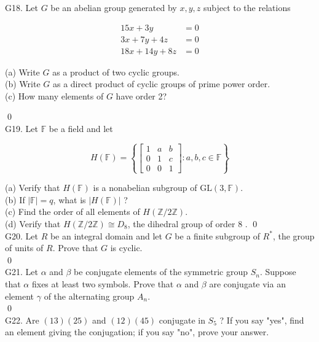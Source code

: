 G18. Let $G$ be an abelian group generated by $x, y, z$ subject to the relations

$$
\begin{aligned}
	15 x+3 y & =0 \\
	3 x+7 y+4 z & =0 \\
	18 x+14 y+8 z & =0
\end{aligned}
$$

(a) Write $G$ as a product of two cyclic groups.\\
(b) Write $G$ as a direct product of cyclic groups of prime power order.\\
(c) How many elements of $G$ have order 2?

\soln
\qed\\

G19. Let $\mathbb{F}$ be a field and let

$$
H(\mathbb{F})=\left\{\left[\begin{array}{ccc}
	1 & a & b \\
	0 & 1 & c \\
	0 & 0 & 1
\end{array}\right]: a, b, c \in \mathbb{F}\right\}
$$

(a) Verify that $H(\mathbb{F})$ is a nonabelian subgroup of $\mathrm{GL}(3, \mathbb{F})$.\\
(b) If $|\mathbb{F}|=q$, what is $|H(\mathbb{F})|$ ?\\
(c) Find the order of all elements of $H(\mathbb{Z} / 2 \mathbb{Z})$.\\
(d) Verify that $H(\mathbb{Z} / 2 \mathbb{Z}) \cong D_{8}$, the dihedral group of order 8 .
\soln
\qed\\

G20. Let $R$ be an integral domain and let $G$ be a finite subgroup of $R^{*}$, the group of units of $R$. Prove that $G$ is cyclic.\\
\soln
\qed\\

G21. Let $\alpha$ and $\beta$ be conjugate elements of the symmetric group $S_{n}$. Suppose that $\alpha$ fixes at least two symbols. Prove that $\alpha$ and $\beta$ are conjugate via an element $\gamma$ of the alternating group $A_{n}$.\\

\soln
\qed\\

G22. Are $(13)(25)$ and $(12)(45)$ conjugate in $S_{5}$ ? If you say "yes", find an element giving the conjugation; if you say "no", prove your answer.\\


